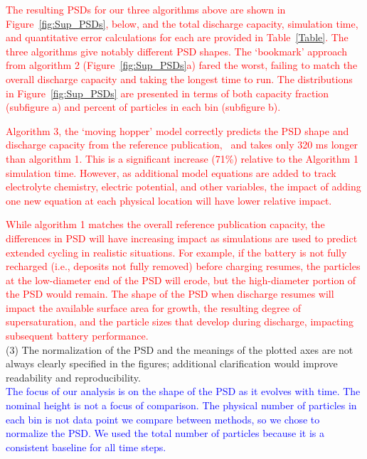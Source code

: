 \documentclass[12 pt]{article}    %
\begin{document}
\textcolor{red}{The resulting PSDs for our three algorithms above are shown in Figure~\ref{fig:Sup_PSDs}, below, and the total discharge capacity, simulation time, and quantitative error calculations for each are provided in Table~\ref{Table}. The three algorithms give notably different PSD shapes. The `bookmark' approach from algorithm 2 (Figure~\ref{fig:Sup_PSDs}a) fared the worst, failing to match the overall discharge capacity and taking the longest time to run.  The distributions in Figure~\ref{fig:Sup_PSDs} are presented in terms of both capacity fraction (subfigure a) and percent of particles in each bin (subfigure b).  }

\textcolor{red}{Algorithm 3, the `moving hopper' model correctly predicts the PSD shape and discharge capacity from the reference publication,~\cite{bib:Verify} and takes only 320 ms longer than algorithm 1. This is a significant increase (71\%) relative to the Algorithm 1 simulation time. However, as additional model equations are added to track electrolyte chemistry, electric potential, and other  variables, the impact of adding one new equation at each physical location will have lower relative impact.}

\textcolor{red}{While algorithm 1 matches the overall  reference publication capacity, the differences in PSD will have increasing impact as simulations are used to predict extended cycling in realistic situations. For example, if the battery is not fully recharged (i.e., deposits not fully removed) before charging resumes, the particles at the low-diameter end of the PSD will erode, but the high-diameter portion of the PSD would remain. The shape of the PSD when discharge resumes will impact the available surface area for growth, the resulting degree of supersaturation, and the particle sizes that develop during discharge, impacting subsequent battery performance.}\\ 

\noindent(3) The normalization of the PSD and the meanings of the plotted axes are not always clearly specified in the figures; additional clarification would improve readability and reproducibility. \\ 

\noindent\textcolor{blue}{The focus of our analysis is on the shape of the PSD as it evolves with time. The nominal height is not a focus of comparison. The physical number of particles in each bin is not data point we compare between methods, so we chose to normalize the PSD. We used the total number of particles because it is a consistent baseline for all time steps.}\\ 
\end{document}
